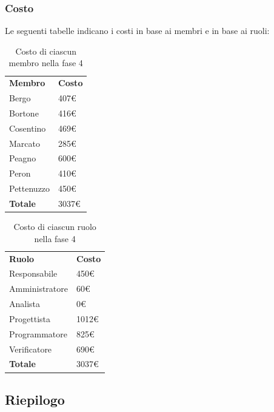 	\subsubsection{Costo}
		Le seguenti tabelle indicano i costi in base ai membri e in base ai ruoli:
		\begin{table}[H]
			\centering
			\begin{tabular}{| l | l |}
				\rowcolor{LightBlue}
				\textbf{\color{white}Membro}
				& \textbf{\color{white}Costo}\\
				
				Bergo				& 407€\\
				Bortone			& 416€\\
				Cosentino		& 469€\\
				Marcato			& 285€\\
				Peagno				& 600€\\
				Peron				& 410€\\
				Pettenuzzo		& 450€\\ \hline
				\textbf{Totale} & 3037€\\ \hline
			\end{tabular}
			\caption{Costo di ciascun membro nella fase 4}
		\end{table}
		
		\begin{table}[H]
			\centering
			\begin{tabular}{| l | l |}
				\rowcolor{LightBlue}
				\textbf{\color{white}Ruolo}
				& \textbf{\color{white}Costo}\\
				
				Responsabile 		& 450€\\
				Amministratore 	& 60€\\
				Analista 				& 0€\\			
				Progettista 			& 1012€\\
				Programmatore 		& 825€\\
				Verificatore 		& 690€\\ \hline
				\textbf{Totale} 	& 3037€\\ \hline
			\end{tabular}		
			\caption{Costo di ciascun ruolo nella fase 4}
		\end{table}

\subsection{Riepilogo}
